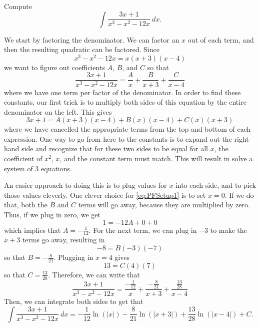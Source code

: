 \documentclass{ximera}
\begin{document}
\begin{example}
    Compute
    \begin{equation*}
        \int \frac{3x + 1}{x^3 - x^2 - 12x}\ dx.
    \end{equation*}
\end{example}

\begin{exampleSol}
    We start by factoring the denominator. We can factor an $x$ out of each term, and then the resulting quadratic can be factored. Since
    \begin{equation*}
        x^3 - x^2 - 12x = x(x+3)(x-4)
    \end{equation*}
    we want to figure out coefficients $A$, $B$, and $C$ so that
    \begin{equation*}
        \frac{3x + 1}{x^3 - x^2 - 12x} = \frac{A}{x} + \frac{B}{x+3} + \frac{C}{x-4} 
    \end{equation*}
    where we have one term per factor of the denominator. In order to find these constants, our first trick is to multiply both sides of this equation by the entire denominator on the left. This gives
    \begin{equation} \label{eq:PFSetup1}
        3x+1 = A(x+3)(x-4) + B(x)(x-4) + C(x)(x+3)
    \end{equation}
    where we have cancelled the appropriate terms from the top and bottom of each expression. One way to go from here to the constants is to expand out the right-hand side and recognize that for these two sides to be equal for all $x$, the coefficient of $x^2$, $x$, and the constant term must match. This will result in solve a system of 3 equations. 
    
    An easier approach to doing this is to plug values for $x$ into each side, and to pick those values cleverly. One clever choice for \eqref{eq:PFSetup1} is to set $x=0$. If we do that, both the $B$ and $C$ terms will go away, because they are multiplied by zero. Thus, if we plug in zero, we get
    \begin{equation*}
        1 = -12A + 0 + 0
    \end{equation*}
    which implies that $A = -\frac{1}{12}$. For the next term, we can plug in $-3$ to make the $x+3$ terms go away, resulting in
    \begin{equation*}
        -8 = B(-3)(-7)
    \end{equation*} so that $B = -\frac{8}{21}$. Plugging in $x=4$ gives
    \begin{equation*}
        13 = C(4)(7)
    \end{equation*}
    so that $C = \frac{13}{28}$. Therefore, we can write that
    \begin{equation*}
        \frac{3x + 1}{x^3 - x^2 - 12x} = \frac{-\frac{1}{12}}{x} + \frac{ -\frac{8}{21}}{x+3} + \frac{\frac{13}{28}}{x-4}
    \end{equation*}
    Then, we can integrate both sides to get that
    \begin{equation*}
        \int \frac{3x + 1}{x^3 - x^2 - 12x}\ dx = -\frac{1}{12}\ln(|x|) - \frac{8}{21}\ln(|x+3|) + \frac{13}{28} \ln(|x-4|) + C.
    \end{equation*}
\end{exampleSol}
\end{document}
